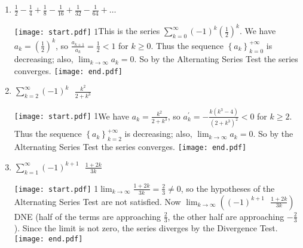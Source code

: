 \documentclass[12pt]{article}
\begin{document}
\begin{enumerate}

\item $\frac{1}{2}-\frac{1}{4}+\frac{1}{8}-\frac{1}{16}+\frac{1}{32}-\frac{1}{64}+\ldots$

\texttt{[image: start.pdf]}
{{{1\linewidth}{This is the series $\sum_{k=0}^{\infty}{(-1)^k \left(\frac{1}{2}\right)^k}$.   
\newline  \newline  We have $\textstyle a_k=\left(\frac{1}{2}\right)^k$, so $\frac{a_{k+1}}{a_k}=\frac{1}{2}<1$ for $k \geq 0$.     
\newline \newline Thus the sequence $\left\{a_k \right\}_{k=0}^{+\infty}$ is decreasing; also, $\lim_{k \rightarrow \infty}{a_k}=0$.
\newline \newline So by the Alternating Series Test the series converges.
\newline  [Of course this is just a geometric series with $\textstyle r=-\frac{1}{2}$.]
  }}}
\texttt{[image: end.pdf]}


\item $\sum_{k=2}^{\infty}{(-1)^k \text{ } \frac{k^2}{2+k^3}}$

\texttt{[image: start.pdf]}
{{{1\linewidth}{We have $a_k=\frac{k^2}{2+k^3}$, so $a_k^\prime=-\frac{k (k^3-4)}{(2+k^3)^2}<0$ for $k\geq2$.     
\newline \newline Thus the sequence $\left\{a_k \right\}_{k=2}^{+\infty}$ is decreasing; also, $\lim_{k \rightarrow \infty}{a_k}=0$.
\newline \newline So by the Alternating Series Test the series converges.
  }}}
\texttt{[image: end.pdf]}


\item $\sum_{k=1}^{\infty}{(-1)^{k+1} \text{ } \frac{1+2k}{3k}}$

\texttt{[image: start.pdf]}
{{{1\linewidth}{$\lim_{k \rightarrow \infty}{\frac{1+2k}{3k}}=\frac{2}{3}\neq0$, so the hypotheses of the Alternating Series Test are not satisfied.
\newline \newline Now $\lim_{k \rightarrow \infty}{\left((-1)^{k+1} \text{ } \frac{1+2k}{3k}\right)}$ DNE (half of the terms are approaching $\tfrac{2}{3}$, the other half are approaching $-\tfrac{2}{3}$).  Since the limit is not zero, the series diverges by the Divergence Test.  }}}
\texttt{[image: end.pdf]}


\end{enumerate}
\end{document}
